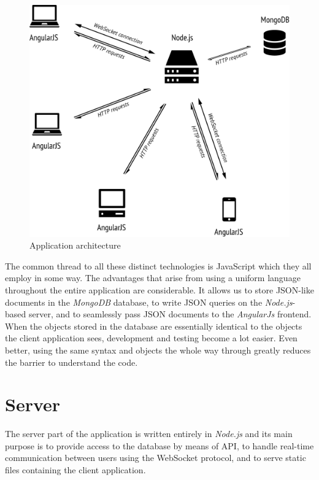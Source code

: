 \documentclass[thesis=M,english,hidelinks]{FITthesis}[2012/10/20]
\begin{document}
\begin{figure}[h]
  \includegraphics[width=\textwidth]{architecture.png}
  \caption{Application architecture}
  \label{fig:architecture}
\end{figure}

The common thread to all these distinct technologies is JavaScript which they all employ in some way. The advantages that arise from using a uniform language throughout the entire application are considerable. It allows us to store JSON-like documents in the \textit{MongoDB} database, to write JSON queries on the \textit{Node.js}-based server, and to seamlessly pass JSON documents to the \textit{AngularJs} frontend. When the objects stored in the database are essentially identical to the objects the client application sees, development and testing become a lot easier. Even better, using the same syntax and objects the whole way through greatly reduces the barrier to understand the code.

  \section{Server}

The server part of the application is written entirely in \textit{Node.js} and its main purpose is to provide access to the database by means of API, to handle real-time communication between users using the WebSocket protocol, and to serve static files containing the client application.
\end{document}
